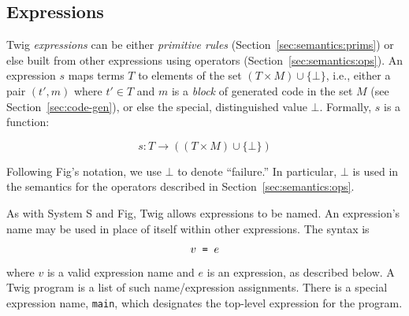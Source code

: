 
\subsection{Expressions}
\label{sec:expressions}

Twig \emph{expressions} can be either \emph{primitive rules}
(Section~\ref{sec:semantics:prims}) or else built from other
expressions using operators (Section~\ref{sec:semantics:ops}). An
expression $s$ maps terms $T$ to elements of the set $(T \times M)
\cup \{\bot\}$, i.e., either a pair $(t',m)$ where $t' \in T$ and
$m$ is a \emph{block} of generated code in the set $M$ (see
Section~\ref{sec:code-gen}), or else the special, distinguished
value $\bot$. Formally, $s$ is a function:

\[
s : T \to ((T \times M) \cup \{\bot\})
\]

Following Fig's notation, we use $\bot$ to denote ``failure.'' In
particular, $\bot$ is used in the semantics for the operators
described in Section~\ref{sec:semantics:ops}.

As with System S and Fig, Twig allows expressions to be named. An
expression's name may be used in place of itself within other
expressions. The syntax is

\[
v \mbox{\texttt{ = }} e
\]

where $v$ is a valid expression name and $e$ is an expression, as
described below. A Twig program is a list of such name/expression
assignments. There is a special expression name, \texttt{main},
which designates the top-level expression for the program.
